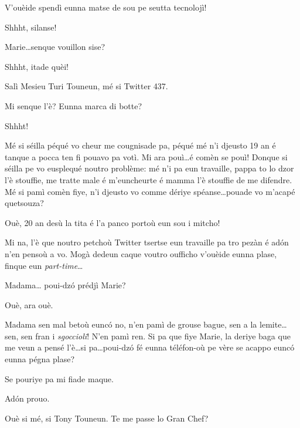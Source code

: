 \begin{drama}
\Turispeaks{} V'ouèide spendì eunna matse de sou pe seutta tecnolojì!

\Mariespeaks Shhht, silanse!


\Turispeaks{} Marie\ldots senque vouillon sise?

\Mariespeaks Shhht, itade quèi!

\Twitterspeaks Salì Mesieu Turi Touneun, mé si Twitter 437.

\Turispeaks{} Mi senque l'è? Eunna marca di botte?

\Mariespeaks Shhht!

\Twitterspeaks{} Mé si séilla péqué vo cheur me cougnisade pa, péqué mé n'i djeusto 19 an é tanque a pocca ten fi pouavo pa votì.  Mi ara pouì\ldots é comèn se pouì! Donque si séilla pe vo eusplequé noutro problème: mé n'i pa eun travaille, pappa to lo dzor l'è stouffie, me tratte male é m'euncheurte é mamma l’è stouffie de me difendre. Mé si pamì comèn fiye, n'i djeusto vo comme dériye spéanse\ldots pouade vo m'acapé quetsouza?

\Tanteunspeaks{} Ouè,  20 an desù la tita é l’a panco portoù eun sou i mitcho!

\Alicespeaks{} Mi na, l'è que noutro petchoù Twitter tsertse eun travaille pa tro pezàn é ad\'on n’en pensoù a vo. Mogà dedeun caque voutro oufficho v'ouèide eunna plase, finque eun \textit{part-time}\ldots

\Turispeaks Madama\ldots {} poui-dz\'o prédjì Marie?

\Mariespeaks Ouè, ara ouè.

\Turispeaks{} Madama sen mal betoù eunc\'o no, n'en pamì de grouse bague, sen a la lemite\ldots sen, sen fran i \textit{sgoccioli}! N'en pamì ren.  Si pa que fiye Marie, la deriye baga que me veun a pensé l'è\ldots si pa\ldots poui-dz\'o fé eunna téléfon-où pe vère se acappo eunc\'o eunna pégna plase?

\Mariespeaks Se pouriye pa mi fiade maque.

\Turispeaks Ad\'on prouo.



\Turispeaks{} Ouè si mé, si Tony Touneun. Te me passe lo Gran Chef? 


\end{drama}
